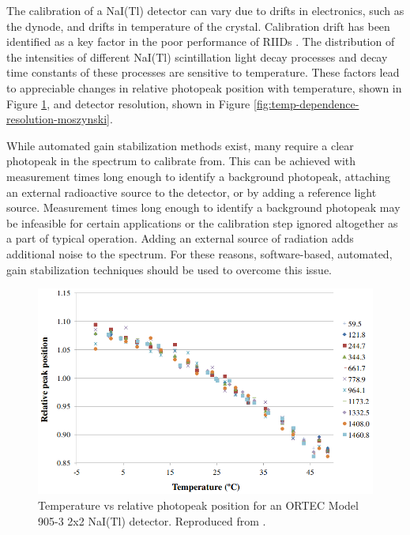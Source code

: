 
The calibration of a NaI(Tl) detector can vary due to drifts in electronics, such as the dynode, and drifts in temperature of the crystal. Calibration drift has been identified as a key factor in the poor performance of RIIDs \cite{blackadar2003}. The distribution of the intensities of different NaI(Tl) scintillation light decay processes \cite{IANAKIEV2009432} and decay time constants of these processes \cite{MOSZYNSKI2006739} are sensitive to temperature. These factors lead to appreciable changes in relative photopeak position with temperature, shown in Figure \ref{fig:CASANOVAS2012588}, and detector resolution, shown in Figure \ref{fig:temp-dependence-resolution-moszynski}. 

While automated gain stabilization methods exist, many require a clear photopeak in the spectrum to calibrate from. This can be achieved with measurement times long enough to identify a background photopeak, attaching an external radioactive source to the detector, or by adding a reference light source. Measurement times long enough to identify a background photopeak may be infeasible for certain applications or the calibration step ignored altogether as a part of typical operation. Adding an external source of radiation adds additional noise to the spectrum. For these reasons, software-based, automated, gain stabilization techniques should be used to overcome this issue.

\begin{figure}[H]
\centering
\includegraphics[width=0.95\linewidth]{images/temp_vs_relative_peak_position_CASANOVAS2012588}
\caption{Temperature vs relative photopeak position for an ORTEC Model 905-3 2x2 NaI(Tl) detector.  Reproduced from \cite{CASANOVAS2012588}.}
\label{fig:CASANOVAS2012588}
\end{figure}



